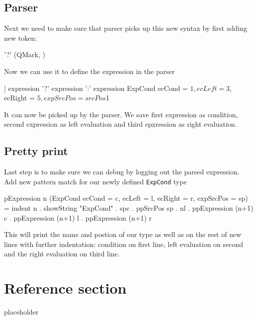 \documentclass{article}
\begin{document}
\subsection{Parser}
\begin{flushleft}
Next we need to make sure that parser picks up this new syntax by first adding new token:
\end{flushleft}
\begin{code}
'?'         { (QMark, $$) }
\end{code}
\begin{flushleft}
Now we can use it to define the expression in the parser
\end{flushleft}
\begin{code}
| expression '?' expression ':' expression
    { ExpCond {ecCond    = $1,
               ecLeft    = $3,
               ecRight   = $5,
               expSrcPos = srcPos $1} }
\end{code}
\begin{flushleft}
It can now be picked up by the parser. We save first expression as condition, second expression as left evaluation and third epxression as right evaluation.
\end{flushleft}

\subsection{Pretty print}
\begin{flushleft}
Last step is to make sure we can debug by logging out the parsed expression. Add new pattern match for our newly defined \texttt{ExpCond} type
\end{flushleft}
\begin{code}
pExpression n (ExpCond {ecCond = c, ecLeft = l, ecRight = r, expSrcPos = sp}) =
    indent n . showString "ExpCond" . spc . ppSrcPos sp . nl
    . ppExpression (n+1) c
    . ppExpression (n+1) l
    . ppExpression (n+1) r
\end{code}
\begin{flushleft}
This will print the name and postion of our type as well as on the rest of new lines with further indentation:
condition on first line, left evaluation on second and the right evaluation on third line.
\end{flushleft}

\pagebreak
\section*{Reference section} \label{sec:reference}
\begin{description}
	\item[placeholder] \hfill \\
\end{description}
\end{document}
